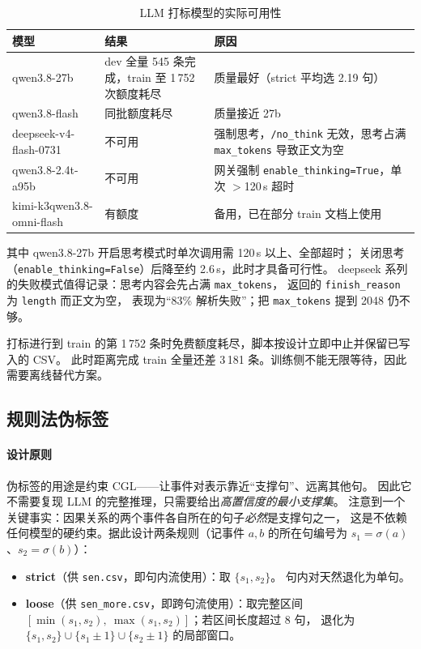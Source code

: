 \begin{table}[H]
\centering
\caption{LLM 打标模型的实际可用性}
\label{tab:llm}
\small
\begin{tabularx}{\textwidth}{@{}p{4.6cm} l X@{}}
\toprule
模型 & 结果 & 原因\\
\midrule
qwen3.8-27b & dev 全量 545 条完成，train 至 1\,752 次额度耗尽 & 质量最好（strict 平均选 2.19 句）\\
qwen3.8-flash & 同批额度耗尽 & 质量接近 27b\\
deepseek-v4-flash-0731 & 不可用 & 强制思考，\texttt{/no\_think} 无效，思考占满 \texttt{max\_tokens} 导致正文为空\\
qwen3.8-2.4t-a95b & 不可用 & 网关强制 \texttt{enable\_}\allowbreak\texttt{thinking}\allowbreak\texttt{=True}，单次 $>$120\,s 超时\\
kimi-k3\newline qwen3.8-omni-flash & 有额度 & 备用，已在部分 train 文档上使用\\
\bottomrule
\end{tabularx}
\end{table}

其中 qwen3.8-27b 开启思考模式时单次调用需 120\,s 以上、全部超时；
关闭思考（\texttt{enable\_thinking=False}）后降至约 2.6\,s，此时才具备可行性。
deepseek 系列的失败模式值得记录：思考内容会先占满 \texttt{max\_tokens}，
返回的 \texttt{finish\_reason} 为 \texttt{length} 而正文为空，
表现为“83\% 解析失败”；把 \texttt{max\_tokens} 提到 2048 仍不够。

打标进行到 train 的第 1\,752 条时免费额度耗尽，脚本按设计立即中止并保留已写入的 CSV。
此时距离完成 train 全量还差 3\,181 条。训练侧不能无限等待，因此需要离线替代方案。

\subsection{规则法伪标签}

\paragraph{设计原则}伪标签的用途是约束 CGL——让事件对表示靠近“支撑句”、远离其他句。
因此它不需要复现 LLM 的完整推理，只需要给出\emph{高置信度的最小支撑集}。
注意到一个关键事实：因果关系的两个事件各自所在的句子\emph{必然}是支撑句之一，
这是不依赖任何模型的硬约束。据此设计两条规则（记事件 $a,b$ 的所在句编号为
$s_1=\sigma(a)$、$s_2=\sigma(b)$）：

\begin{itemize}
  \item \textbf{strict}（供 \texttt{sen.csv}，即句内流使用）：取 $\{s_1,s_2\}$。
        句内对天然退化为单句。
  \item \textbf{loose}（供 \texttt{sen\_more.csv}，即跨句流使用）：取完整区间
        $[\min(s_1,s_2),\ \max(s_1,s_2)]$；若区间长度超过 8 句，
        退化为 $\{s_1,s_2\}\cup\{s_1\pm1\}\cup\{s_2\pm1\}$ 的局部窗口。
\end{itemize}

